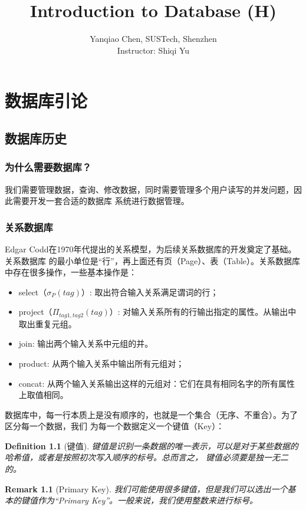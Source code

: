 \documentclass[12pt,a4paper,UTF8]{ctexbook}
\title{\bf{Introduction to Database (H)}}
\author{Yanqiao Chen, SUSTech, Shenzhen\\
        Instructor: Shiqi Yu}
\theoremstyle{plain}
\newtheorem{definition}{\indent Definition}[chapter]
\newtheorem{remark}{\indent Remark}[chapter]
\begin{document}
\setlength{\arrayrulewidth}{0.4pt}
\newcommand{\thickline}{\noalign{\hrule height 2pt}}

\maketitle
\tableofcontents

\chapter{数据库引论} 

\section{数据库历史}
\subsection{为什么需要数据库？} 
我们需要管理数据，查询、修改数据，同时需要管理多个用户读写的并发问题，因此需要开发一套合适的数据库
系统进行数据管理。 

\subsection{关系数据库} 
Edgar Codd在1970年代提出的关系模型，为后续关系数据库的开发奠定了基础。关系数据库 
的最小单位是“行”，再上面还有页（Page）、表（Table）。关系数据库中存在很多操作，一些基本操作是：
\begin{itemize} 
    \item select（$\sigma_{P}(tag)$）: 取出符合输入关系满足谓词的行；
    \item project（$\Pi_{tag1, tag2}(tag)$）: 对输入关系所有的行输出指定的属性。从输出中取出重复元组。
    \item join: 输出两个输入关系中元组的并。
    \item product: 从两个输入关系中输出所有元组对；
    \item concat: 从两个输入关系输出这样的元组对：它们在具有相同名字的所有属性上取值相同。
\end{itemize} 
数据库中，每一行本质上是没有顺序的，也就是一个集合（无序、不重合）。为了区分每一个数据，我们
为每一个数据定义一个键值（Key）： 
\begin{definition}[键值] 
    键值是识别一条数据的唯一表示，可以是对于某些数据的哈希值，或者是按照初次写入顺序的标号。总而言之，
    键值必须要是独一无二的。
\end{definition}

\begin{remark}[Primary Key]
    我们可能使用很多键值，但是我们可以选出一个基本的键值作为“Primary Key”。一般来说，我们使用整数来进行标号。
\end{remark} 
\end{document}
